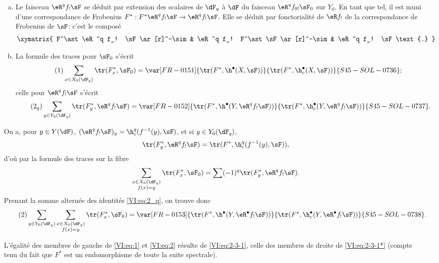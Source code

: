 \begin{enumerate}[a)]
  \item Le faisceau $\eR^q f_! \sF$ se déduit par extension des scalaires de 
    $\dF_q$ à $\dF$ du faisceau $\eR^q f_{0!} \sF_0$ sur $Y_0$. En tant que 
    tel, il est muni d'une correspondance de Frobenius 
    $F^\ast:F^\ast\eR^q f_! \sF \to \eR^q f_! \sF$. Elle se déduit par 
    fonctorialité de $\eR f_!$ de la correspondance de Frobenius de $\sF$: 
    c'est le composé 
    \[\xymatrix{
      F^\ast \eR^q f_! \sF \ar[r]^-\sim 
        & \eR^q f_! F^\ast \sF \ar[r]^-\sim 
        & \eR^q f_! \sF \text{.}
    }\]
  \item La formule des traces pour $\sF_0$ s'écrit 
    \begin{align*}\tag{1}\label{VI:eq:1}
      \sum_{x\in X_0(\dF_q)} \tr(F_x^\ast,\sF_0) = \var[FR-0151]{\tr(F^\ast,\h^\bullet(X,\sF))}{\tr(F^\ast,\h_c^\bullet(X,\sF))}{S45-SOL-0736} \text{;}
    \end{align*}
    celle pour $\eR^q f_! \sF$ s'écrit 
    \begin{align*}\tag{2$_q$}\label{VI:eq:2_q} 
      \sum_{y\in Y_0(\dF_q)} \tr(F_y^\ast,\eR^q f_! \sF) = \var[FR-0152]{\tr(F^\ast, \h^\bullet(Y,\eR^q f_! \sF))}{\tr(F^\ast,\h_c^\bullet(Y,\eR^q f_! \sF))}{S45-SOL-0737} \text{.}
    \end{align*}
\end{enumerate}

On a, pour $y\in Y(\dF)$, $(\eR^q f_! \sF)_y = \h_c^q(f^{-1}(y),\sF)$, et si 
$y\in Y_0(\dF_q)$, 
\[
  \tr(F_y^\ast,\eR^q f_! \sF) = \tr(F^\ast,\h_c^q(f^{-1}(y),\sF)) \text{,}
\]
d'où par la formule des traces sur la fibre 
\[
  \sum_{\substack{x\in X_0(\dF_q) \\ f(x) = y}} \tr(F_x^\ast,\sF_0) = \sum (-1)^q \tr(F_y^\ast,\eR^q f_! \sF) \text{.}
\]
Prenant la somme alternée des identités \eqref{VI:eq:2_q}, on trouve donc 
\begin{align*}\tag{2}\label{VI:eq:2}
  \sum_{y\in Y_0(\dF_q)} \sum_{\substack{x \in X_0(\dF_q) \\ f(x) = y}} \tr(F_x^\ast,\sF_0) = \var[FR-0153]{\tr(F^\ast,\h^\bullet(Y,\eR^\bullet f_! \sF))}{\tr(F^\ast,\h_c^\bullet(Y,\eR^\bullet f_! \sF))}{S45-SOL-0738} \text{.}
\end{align*}

L'égalité des membres de gauche de \eqref{VI:eq:1} et \eqref{VI:eq:2} 
résulte de \eqref{VI:eq:2-3-1}, celle des membres de droite de 
\eqref{VI:eq:2-3-1*} (compte tenu du fait que $F^\ast$ est un endomorphisme de 
toute la suite spectrale). 





